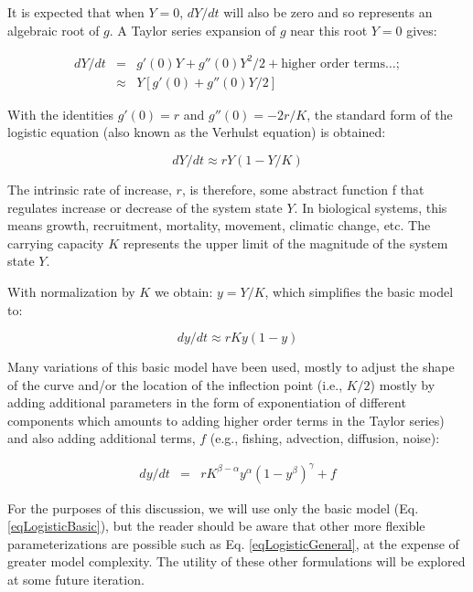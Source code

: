 \documentclass[letterpaper,portrait,11pt]{scrartcl}
\numberwithin{equation}{section}		%
\numberwithin{figure}{section}			%
\numberwithin{table}{section}				%
\begin{document}
\begin{itemize*}
It is expected that when $Y = 0$, $dY/dt$ will also be zero and so represents an algebraic root of $g$. A Taylor series expansion of $g$ near this root $Y=0$ gives:

\begin{eqnarray*} 
  \label{eqLogisticTaylorSeries}
  dY / dt &=&  g'(0) Y + g''(0) Y^{2}/2  + \text{higher order terms} \dots; \\
  &\approx& Y [g'(0) + g''(0) Y/2  ]
\end{eqnarray*}


With the identities $g'(0) = r$  and $g''(0) = - 2r/K$, the standard form of the logistic equation (also known as the Verhulst equation) is obtained:

\begin{equation} 
\label{eqLogistic}
dY/dt \approx r Y (1 - Y/K)
\end{equation}

The intrinsic rate of increase, $r$, is therefore, some abstract function f that regulates increase or decrease of the system state $Y$. In biological systems, this means growth, recruitment, mortality,  movement, climatic change, etc. The carrying capacity $K$ represents the upper limit of the magnitude of the system state $Y$.

With normalization by $K$ we obtain: $ y = Y/K $, which simplifies the basic model to:

\begin{equation} 
\label{eqLogisticBasic}
dy/dt  \approx  r K y (1 - y)
\end{equation}

Many variations of this basic model have been used, mostly to adjust the shape of the curve and/or the location of the inflection point (i.e., $K/2$) mostly by adding additional parameters in the form of exponentiation of different components which amounts to adding higher order terms in the Taylor series) and also adding additional terms, $f$ (e.g., fishing, advection, diffusion, noise): 

\begin{eqnarray} 
\label{eqLogisticGeneral}
dy / dt &=& rK^{\beta-\alpha} y^{\alpha} ( 1 - y^{\beta} )^{\gamma} + f 
\end{eqnarray}

For the purposes of this discussion, we will use only the basic model (Eq. \ref{eqLogisticBasic}), but the reader should be aware that other more flexible parameterizations are possible such as Eq. \ref{eqLogisticGeneral}, at the expense of greater model complexity. The utility of these other formulations will be explored at some future iteration. 


\end{itemize*}
\end{document}
